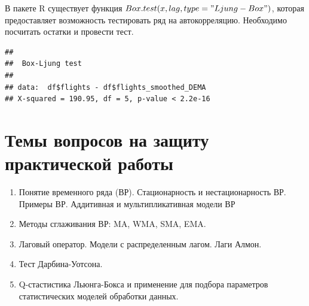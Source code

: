 \documentclass[
]{article}
\newenvironment{Shaded}{}{}
\newcommand{\AttributeTok}[1]{#1}
\newcommand{\DecValTok}[1]{#1}
\newcommand{\FunctionTok}[1]{#1}
\newcommand{\NormalTok}[1]{#1}
\newcommand{\SpecialCharTok}[1]{\textcolor[rgb]{0.00,0.50,0.50}{#1}}
\newcommand{\StringTok}[1]{\textcolor[rgb]{0.00,0.50,0.50}{#1}}
\providecommand{\tightlist}{%
  \setlength{\itemsep}{0pt}\setlength{\parskip}{0pt}}
\begin{document}
В пакете R существует функция \(Box.test(x, lag, type="Ljung-Box")\),
которая предоставляет возможность тестировать ряд на автокорреляцию.
Необходимо посчитать остатки и провести тест.

\begin{Shaded}
\end{Shaded}

\begin{verbatim}
## 
##  Box-Ljung test
## 
## data:  df$flights - df$flights_smoothed_DEMA
## X-squared = 190.95, df = 5, p-value < 2.2e-16
\end{verbatim}

\hypertarget{ux442ux435ux43cux44b-ux432ux43eux43fux440ux43eux441ux43eux432-ux43dux430-ux437ux430ux449ux438ux442ux443-ux43fux440ux430ux43aux442ux438ux447ux435ux441ux43aux43eux439-ux440ux430ux431ux43eux442ux44b}{%
\section{\texorpdfstring{\textbf{Темы вопросов на защиту практической
работы}}{Темы вопросов на защиту практической работы}}\label{ux442ux435ux43cux44b-ux432ux43eux43fux440ux43eux441ux43eux432-ux43dux430-ux437ux430ux449ux438ux442ux443-ux43fux440ux430ux43aux442ux438ux447ux435ux441ux43aux43eux439-ux440ux430ux431ux43eux442ux44b}}

\begin{enumerate}
\def\labelenumi{\arabic{enumi}.}
\tightlist
\item
  Понятие временного ряда (ВР). Стационарность и нестационарность ВР.
  Примеры ВР. Аддитивная и мультипликативная модели ВР
\item
  Методы сглаживания ВР: MA, WMA, SMA, EMA.
\item
  Лаговый оператор. Модели с распределенным лагом. Лаги Алмон.
\item
  Тест Дарбина-Уотсона.
\item
  Q-стастистика Льюнга-Бокса и применение для подбора параметров
  статистических моделей обработки данных.
\end{enumerate}
\end{document}

